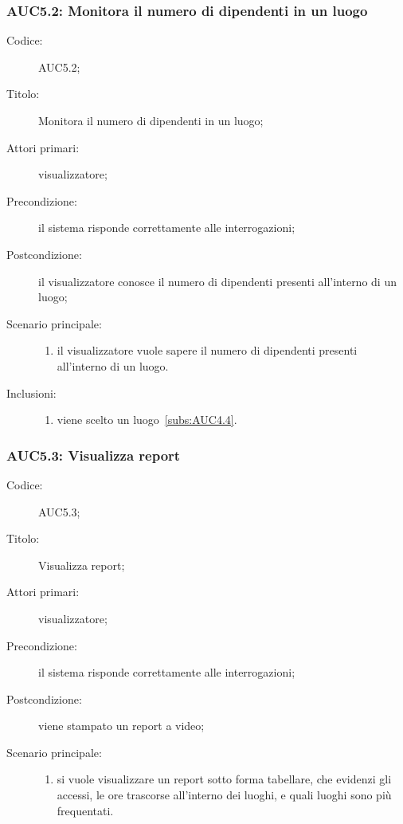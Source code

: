 \documentclass[../../../analisi-dei-requisiti.tex]{subfiles}
\begin{document}
\subsubsection{AUC5.2: Monitora il numero di dipendenti in un luogo}%
\label{subs:AUC5.2}
\begin{description}
  \item[Codice:] AUC5.2;
  \item[Titolo:] Monitora il numero di dipendenti in un luogo;
  \item[Attori primari:] visualizzatore;
  \item[Precondizione:] il sistema risponde correttamente alle interrogazioni;
  \item[Postcondizione:] il visualizzatore conosce il numero di dipendenti presenti all'interno di un luogo;
  \item[Scenario principale:]
  \begin{enumerate}
    \item il visualizzatore vuole sapere il numero di dipendenti presenti all'interno di un luogo.
  \end{enumerate}
  \item[Inclusioni:]
  \begin{enumerate}
    \item viene scelto un luogo~\ref{subs:AUC4.4}.
  \end{enumerate}
\end{description}


\subsubsection{AUC5.3: Visualizza report}%
\label{subs:AUC5.3}
\begin{description}
  \item[Codice:] AUC5.3;
  \item[Titolo:] Visualizza report;
  \item[Attori primari:] visualizzatore;
  \item[Precondizione:] il sistema risponde correttamente alle interrogazioni;
  \item[Postcondizione:] viene stampato un report a video;
  \item[Scenario principale:]
  \begin{enumerate}
    \item si vuole visualizzare un report sotto forma tabellare, che evidenzi gli accessi,
    le ore trascorse all’interno dei luoghi, e quali luoghi sono più frequentati.
  \end{enumerate}
\end{description}
\end{document}
